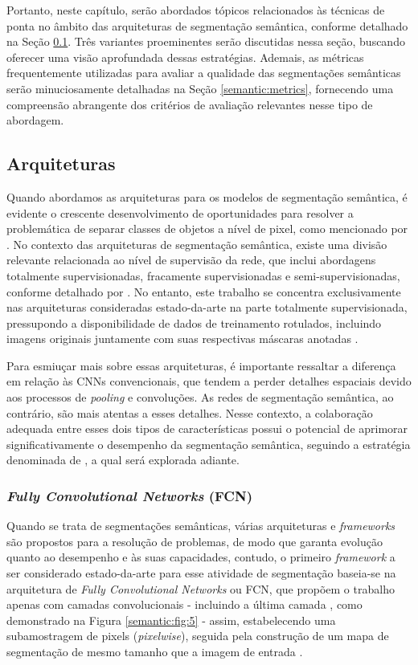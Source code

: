 Portanto, neste capítulo, serão abordados tópicos relacionados às técnicas de ponta no âmbito das arquiteturas de segmentação semântica, conforme detalhado na Seção \ref{semantic:arch}. Três variantes proeminentes serão discutidas nessa seção, buscando oferecer uma visão aprofundada dessas estratégias. Ademais, as métricas frequentemente utilizadas para avaliar a qualidade das segmentações semânticas serão minuciosamente detalhadas na Seção \ref{semantic:metrics}, fornecendo uma compreensão abrangente dos critérios de avaliação relevantes nesse tipo de abordagem.

\subsection{Arquiteturas}
\label{semantic:arch}
Quando abordamos as arquiteturas para os modelos de segmentação semântica, é evidente o crescente desenvolvimento de oportunidades para resolver a problemática de separar classes de objetos a nível de pixel, como mencionado por \citep{Guo2018ANetworksb}. No contexto das arquiteturas de segmentação semântica, existe uma divisão relevante relacionada ao nível de supervisão da rede, que inclui abordagens totalmente supervisionadas, fracamente supervisionadas e semi-supervisionadas, conforme detalhado por \citep{Hao2020ALearning}. No entanto, este trabalho se concentra exclusivamente nas arquiteturas consideradas estado-da-arte na parte totalmente supervisionada, pressupondo a disponibilidade de dados de treinamento rotulados, incluindo imagens originais juntamente com suas respectivas máscaras anotadas \citep{Hao2020ALearning}.

Para esmiuçar mais sobre essas arquiteturas, é importante ressaltar a diferença em relação às CNNs convencionais, que tendem a perder detalhes espaciais devido aos processos de \textit{pooling} e convoluções. As redes de segmentação semântica, ao contrário, são mais atentas a esses detalhes. Nesse contexto, a colaboração adequada entre esses dois tipos de características possui o potencial de aprimorar significativamente o desempenho da segmentação semântica, seguindo a estratégia denominada de , a qual será explorada adiante.

\subsubsection{\textit{Fully Convolutional Networks} (FCN)}
\label{semantic:FCN}
Quando se trata de segmentações semânticas, várias arquiteturas e \textit{frameworks} são propostos para a resolução de problemas, de modo que garanta evolução quanto ao desempenho e às suas capacidades, contudo, o primeiro \textit{framework} a ser considerado estado-da-arte para esse atividade de segmentação baseia-se na arquitetura de \textit{Fully Convolutional Networks} \citep{Shelhamer2016} ou FCN, que propõem o trabalho apenas com camadas convolucionais - incluindo a última camada \citep{Hesamian2019}, como demonstrado na Figura \ref{semantic:fig:5} - assim, estabelecendo uma subamostragem de pixels (\textit{pixelwise}), seguida pela construção de um mapa de segmentação de mesmo tamanho que a imagem de entrada \citep{Minaee2021, Zhang2018, Hesamian2019}.

